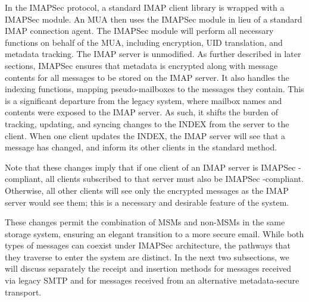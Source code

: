 \documentclass[pageno]{jpaper}
\newcommand{\project}{IMAPSec }
\begin{document}
In the \project protocol, a standard IMAP client library is wrapped with a \project module. An MUA then uses the \project module in lieu of a standard IMAP connection agent. The \project module will perform all necessary functions on behalf of the MUA, including encryption, UID translation, and metadata tracking. The IMAP server is unmodified.
As further described in later sections, \project ensures that metadata is encrypted along with message contents for all messages to be stored on the IMAP server. It also handles the indexing functions, mapping pseudo-mailboxes to the messages they contain. This is a significant departure from the legacy system, where mailbox names and contents were exposed to the IMAP server. As such, it shifts the burden of tracking, updating, and syncing changes to the INDEX from the server to the client. When one client updates the INDEX, the IMAP server will see that a message has changed, and inform its other clients in the standard method. 


Note that these changes imply that if one client of an IMAP server is \project-compliant, all clients subscribed to that server must also be \project-compliant. Otherwise, all other clients will see only the encrypted messages as the IMAP server would see them; this is a necessary and desirable feature of the system.

These changes permit the combination of MSMs and non-MSMs in the same storage system, ensuring an elegant transition to a more secure email. While both types of messages can coexist under \project architecture, the pathways that they traverse to enter the system are distinct. In the next two subsections, we will discuss separately the receipt and insertion methods for messages received via legacy SMTP and for messages received from an alternative metadata-secure transport.

\label{mail-from-secure}
\end{document}

